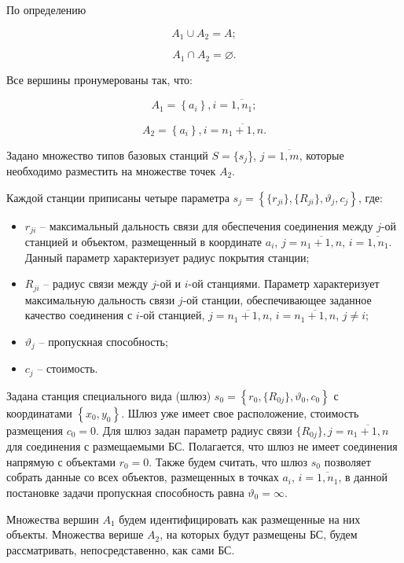 По определению

$$
A_1 \cup A_2 = A;
$$

$$
A_1 \cap A_2 = \varnothing.
$$

Все вершины пронумерованы так, что:

$$
A_1 = \left\{a_i \right\}, i= \overline{1,n_1};
$$

$$
A_2 = \left\{ a_i  \right\}, i= \overline{n_1+1,n}.
$$


Задано множество типов базовых станций $S = \{s_j$\}, $j=\overline{1,m}$, которые необходимо разместить на множестве точек $A_2$.

Каждой станции приписаны четыре параметра $s_j = \left\{\{r_{ji}\}, \{R_{ji}\}, \vartheta_j, c_j \right\}$, где: 
\begin{itemize}
    \item $r_{ji}$ -- максимальный дальность связи для обеспечения соединения между $j$-ой станцией и объектом, размещенный в координате $a_i$, $j= \overline{n_1+1,n}$, $i= \overline{1,n_1}$. Данный параметр характеризует радиус покрытия станции;
    \item $R_{ji}$ -- радиус связи между $j$-ой и $i$-ой станциями. Параметр характеризует максимальную дальность связи $j$-ой станции, обеспечивающее заданное качество соединения с $i$-ой станцией, $j= \overline{n_1+1,n}$, $i= \overline{n_1+1,n}$, $j \neq i$;
    \item $\vartheta_j$ -- пропускная способность;
    \item $c_j$ -- стоимость.
\end{itemize}


Задана станция специального вида (шлюз) $s_0 = \left\{ r_0, \{R_{0j}\}, \vartheta_0, c_0 \right\}$ с координатами $\left\{x_0, y_0 \right\}$. Шлюз уже имеет свое расположение, стоимость размещения $c_0 = 0$. Для шлюз задан параметр радиус связи $\{R_{0j}\}, j = \overline{n_1+1,n}$ для соединения с размещаемыми БС. Полагается, что шлюз не имеет соединения напрямую с объектами $r_0 = 0$. Также будем считать, что шлюз $s_0$ позволяет собрать данные со всех объектов, размещенных в точках $a_i$, $i= \overline{1,n_1}$, в данной постановке задачи пропускная способность равна $\vartheta_0 = \infty$.


Множества вершин $A_1$ будем идентифицировать как размещенные на них объекты. Множества верише $A_2$, на которых будут размещены БС, будем рассматривать, непосредставенно, как сами БС. 

